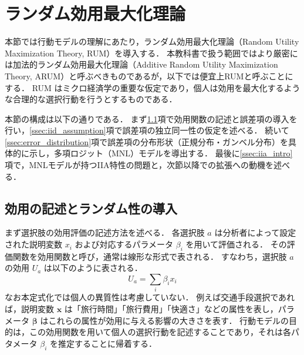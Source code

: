 \section{ランダム効用最大化理論}\label{sec:rut}

本節では行動モデルの理解にあたり，ランダム効用最大化理論（Random Utility Maximization Theory, RUM）\cite{mcfadden1977modelling}を導入する．
本教科書で扱う範囲ではより厳密には加法的ランダム効用最大化理論（Additive Random Utility Maximization Theory, ARUM）と呼ぶべきものであるが，以下では便宜上RUMと呼ぶことにする．
RUM はミクロ経済学の重要な仮定であり，個人は効用を最大化するような合理的な選択行動を行うとするものである．

本節の構成は以下の通りである．
まず\ref{ssec:utility_random}項で効用関数の記述と誤差項の導入を行い，\ref{ssec:iid_assumption}項で誤差項の独立同一性の仮定を述べる．
続いて\ref{ssec:error_distribution}項で誤差項の分布形状（正規分布・ガンベル分布）を具体的に示し，多項ロジット（MNL）モデルを導出する．
最後に\ref{ssec:iia_intro}項で，MNLモデルが持つIIA特性の問題と，次節以降での拡張への動機を述べる．

\subsection{効用の記述とランダム性の導入}\label{ssec:utility_random}
まず選択肢の効用評価の記述方法を述べる．
各選択肢 $a$ は分析者によって設定された説明変数 $x_{i}$ および対応するパラメータ $\beta_{i}$ を用いて評価される．
その評価関数を効用関数と呼び，通常は線形な形式で表される．
すなわち，選択肢 $a$ の効用 $U_{a}$ は以下のように表される．
\begin{equation}\label{eq:utility_func_det}
U_{a} = \sum_{i} \beta_{i} x_{i}
\end{equation}
なお本定式化では個人の異質性は考慮していない．
例えば交通手段選択であれば，説明変数 $\bm{x}$ は「旅行時間」「旅行費用」「快適さ」などの属性を表し，パラメータ $\bm{\beta}$ はこれらの属性が効用に与える影響の大きさを表す．
行動モデルの目的は，この効用関数を用いて個人の選択行動を記述することであり，それは各パタメータ $\beta_{i}$ を推定することに帰着する．

